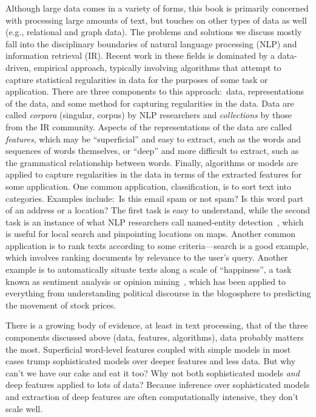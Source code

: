 Although large data comes in a variety of forms, this book is
primarily concerned with processing large amounts of text, but touches
on other types of data as well (e.g., relational and graph data). The
problems and solutions we discuss mostly fall into the disciplinary
boundaries of natural language processing (NLP) and information
retrieval (IR).  Recent work in these fields is dominated by a
data-driven, empirical approach, typically involving algorithms that
attempt to capture statistical regularities in data for the purposes
of some task or application.  There are three components to this
approach:\ data, representations of the data, and some method for
capturing regularities in the data.  Data are called {\it corpora}
(singular, corpus) by NLP researchers and {\it collections} by those
from the IR community.  Aspects of the representations of the data are
called {\it features}, which may be ``superficial'' and easy to
extract, such as the words and sequences of words themselves, or
``deep'' and more difficult to extract, such as the grammatical
relationship between words.  Finally, algorithms or models are applied
to capture regularities in the data in terms of the extracted features
for some application.  One common application, classification, is to
sort text into categories.  Examples include:\ Is this email spam or
not spam?  Is this word part of an address or a location?  The first
task is easy to understand, while the second task is an instance of
what NLP researchers call named-entity
detection~\cite{Sekine_Ranchhod_2009}, which is useful for local
search and pinpointing locations on maps.  Another common application
is to rank texts according to some criteria---search is a good
example, which involves ranking documents by relevance to the user's
query.  Another example is to automatically situate texts along a
scale of ``happiness'', a task known as sentiment analysis or opinion
mining~\cite{Pang_Lee_2008}, which has been applied to everything from
understanding political discourse in the blogosphere to predicting the
movement of stock prices.

There is a growing body of evidence, at least in text processing, that
of the three components discussed above (data, features, algorithms),
data probably matters the most.  Superficial word-level features
coupled with simple models in most cases trump sophisticated models
over deeper features and less data.  But why can't we have our cake
and eat it too?  Why not both sophisticated models {\it and} deep
features applied to lots of data?  Because inference over
sophisticated models and extraction of deep features are often
computationally intensive, they don't scale well.

